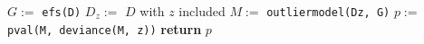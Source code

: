 \documentclass[preview]{standalone}
\begin{document}
\centering
\begin{algorithmic}[1]
  \State $G:=$ \texttt{efs(D)} 
  \State $D_z :=$ $D$ with $z$ included
  \State $M:=$ \texttt{outlier\textunderscore model(D\textunderscore z, G)}
  \State $p:=$ \texttt{p\textunderscore val(M, deviance(M, z))}
  \State \textbf{return} $p$
  \EndProcedure
\end{algorithmic}
\end{document}

